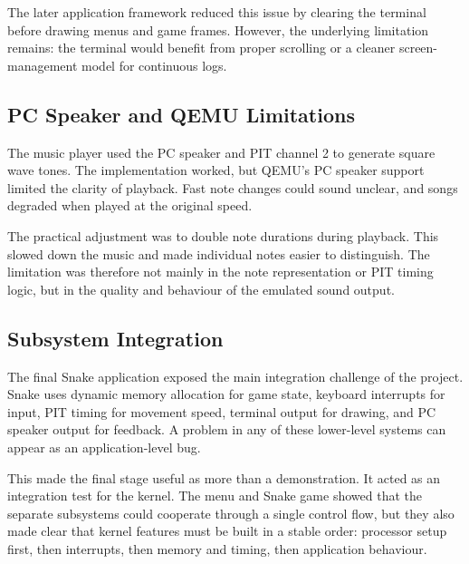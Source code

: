 The later application framework reduced this issue by clearing the terminal before drawing menus and game frames. However, the underlying limitation remains: the terminal would benefit from proper scrolling or a cleaner screen-management model for continuous logs.

\subsection{PC Speaker and QEMU Limitations}
The music player used the PC speaker and PIT channel 2 to generate square wave tones. The implementation worked, but QEMU's PC speaker support limited the clarity of playback. Fast note changes could sound unclear, and songs degraded when played at the original speed.

The practical adjustment was to double note durations during playback. This slowed down the music and made individual notes easier to distinguish. The limitation was therefore not mainly in the note representation or PIT timing logic, but in the quality and behaviour of the emulated sound output.

\subsection{Subsystem Integration}
The final Snake application exposed the main integration challenge of the project. Snake uses dynamic memory allocation for game state, keyboard interrupts for input, PIT timing for movement speed, terminal output for drawing, and PC speaker output for feedback. A problem in any of these lower-level systems can appear as an application-level bug.

This made the final stage useful as more than a demonstration. It acted as an integration test for the kernel. The menu and Snake game showed that the separate subsystems could cooperate through a single control flow, but they also made clear that kernel features must be built in a stable order: processor setup first, then interrupts, then memory and timing, then application behaviour.

